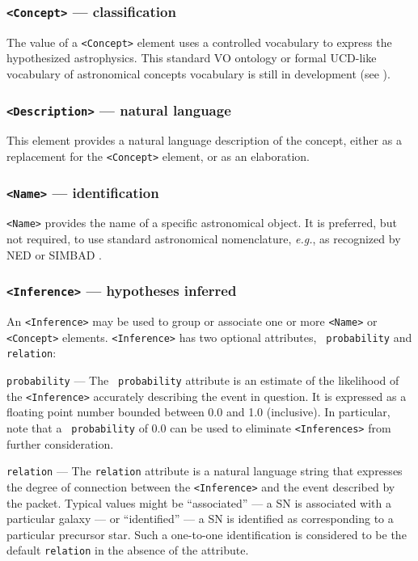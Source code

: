 \documentclass[11pt,a4paper]{ivoa}
\begin{document}
\setcounter{subsubsection}{2} 
\subsubsection{{\tt <Concept>} --- classification}\label{sec:3.6.3}
The value of a {\tt <Concept>} element uses a controlled vocabulary to express 
the hypothesized astrophysics. This standard VO ontology or formal UCD-like 
vocabulary of astronomical concepts vocabulary is still in development (see 
\citep{2018ivoa.spec.0527P}).

\subsubsection{{\tt <Description>} --- natural language}\label{sec:3.6.4}
This element provides a natural language description of the concept, either as 
a replacement for the {\tt <Concept>} element, or as an elaboration. 

\subsubsection{{\tt <Name>} --- identification}\label{sec:3.6.5}
{\tt <Name>} provides the name of a specific astronomical object. It is 
preferred, but not required, to use standard astronomical nomenclature, 
\emph{e.g.}, as recognized by NED \citep{bib22} or SIMBAD \citep{bib23}. 

\subsubsection{{\tt <Inference>} --- hypotheses inferred}\label{sec:3.6.6}
An {\tt <Inference>} may be used to group or associate one or more {\tt <Name>} 
or {\tt <Concept>} elements. {\tt <Inference>} has two optional attributes, {\tt
probability} and {\tt relation}: 

 {\tt probability}\label{sec:3.6.6.1} --- The {\tt 
probability} attribute is an estimate of the likelihood of the {\tt <Inference>}
accurately describing the event in question. It is expressed as a floating point
number bounded between 0.0 and 1.0 (inclusive). In particular, note that a {\tt
probability} of 0.0 can be used to eliminate {\tt <Inferences>} from further 
consideration. 

 {\tt relation}\label{sec:3.6.6.2} --- The {\tt relation}
attribute is a natural language string that expresses the degree of connection 
between the {\tt <Inference>} and the event described by the packet. Typical 
values might be ``associated'' --- a SN is associated with a particular galaxy 
--- or ``identified'' --- a SN is identified as corresponding to a particular 
precursor star. Such a one-to-one identification is considered to be the default
{\tt relation} in the absence of the attribute. 
\end{document}
